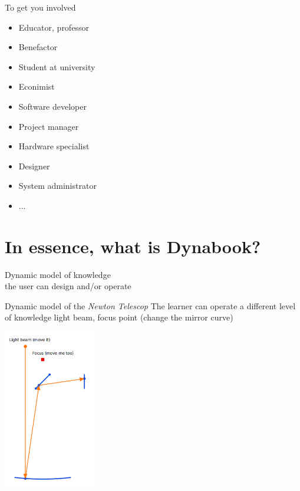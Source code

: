 \documentclass{beamer}
\begin{document}
\begin{frame}{To get you involved}
  \begin{itemize}
  \item Educator, professor
  \item Benefactor
  \item Student at university
  \item Econimist
  \item Software developer
  \item Project manager
  \item Hardware specialist
  \item Designer
  \item System administrator
  \item ...
  \end{itemize}
\end{frame}

\section{In essence, what is Dynabook?}
\begin{frame}
  \fontsize{14pt}{8pt}\selectfont
\begin{center}
  Dynamic model of knowledge\\ the user can design and/or operate
\end{center}
\end{frame}
%
\begin{frame}{Dynamic model of the \emph{Newton Telescop}}
 The learner
  can operate a different level of knowledge light beam, focus point
  (change the mirror curve)
\begin{center}
  \includegraphics[width=0.3\textwidth]{Newton.png}
\end{center}
\end{frame}
\end{document}

